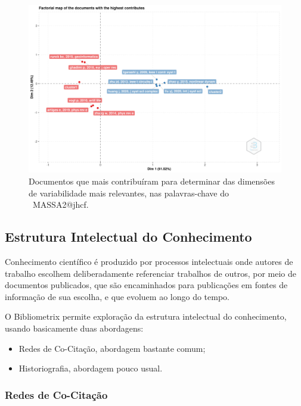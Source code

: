 \begin{figure}
    \centering
    \includegraphics[width=1\textwidth]{exploratory-data-analysis/jhcf/PesqBibliogr/SimulacaoMultiagente/WoS-20220203/Estrutura/Conceitual/MASSA2-FactorialAnalysis-MCA-MostContribDocuments.png}
    \caption{Documentos que mais contribuíram para determinar das dimensões de variabilidade mais relevantes, nas palavras-chave do  \dataset\ MASSA2@jhcf.}
    \label{fig:MASSA2-FactorialAnalysis-MCA-MostContribDocuments}
\end{figure}

\subsection{Estrutura Intelectual  do Conhecimento}

Conhecimento científico é produzido por processos intelectuais onde autores de trabalho escolhem deliberadamente referenciar trabalhos de outros, por meio de documentos publicados, que são encaminhados para publicações em fontes de informação de sua escolha, e que evoluem ao longo do tempo.

O Bibliometrix permite exploração da estrutura intelectual do conhecimento, usando basicamente duas abordagens:
\begin{itemize}
    \item Redes de Co-Citação, abordagem bastante comum;
    \item Historiografia, abordagem pouco usual.
\end{itemize}

\subsubsection{Redes de Co-Citação}

